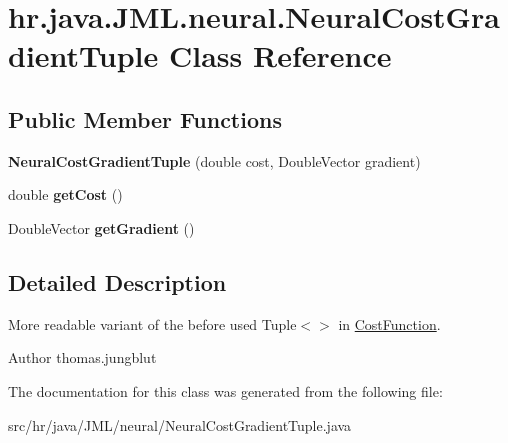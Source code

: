 \hypertarget{classhr_1_1java_1_1_j_m_l_1_1neural_1_1_neural_cost_gradient_tuple}{\section{hr.\+java.\+J\+M\+L.\+neural.\+Neural\+Cost\+Gradient\+Tuple Class Reference}
\label{classhr_1_1java_1_1_j_m_l_1_1neural_1_1_neural_cost_gradient_tuple}
}
\subsection*{Public Member Functions}
\begin{DoxyCompactItemize}
\item 
\hypertarget{classhr_1_1java_1_1_j_m_l_1_1neural_1_1_neural_cost_gradient_tuple_a46fe2e7f1fb0c65b3c9f5e56e49f31e3}{{\bfseries Neural\+Cost\+Gradient\+Tuple} (double cost, Double\+Vector gradient)}\label{classhr_1_1java_1_1_j_m_l_1_1neural_1_1_neural_cost_gradient_tuple_a46fe2e7f1fb0c65b3c9f5e56e49f31e3}

\item 
\hypertarget{classhr_1_1java_1_1_j_m_l_1_1neural_1_1_neural_cost_gradient_tuple_ac0b348d079d3d3bb121501a3198a5e2a}{double {\bfseries get\+Cost} ()}\label{classhr_1_1java_1_1_j_m_l_1_1neural_1_1_neural_cost_gradient_tuple_ac0b348d079d3d3bb121501a3198a5e2a}

\item 
\hypertarget{classhr_1_1java_1_1_j_m_l_1_1neural_1_1_neural_cost_gradient_tuple_afe8955a29eeae12780025db1c94ac4c9}{Double\+Vector {\bfseries get\+Gradient} ()}\label{classhr_1_1java_1_1_j_m_l_1_1neural_1_1_neural_cost_gradient_tuple_afe8955a29eeae12780025db1c94ac4c9}

\end{DoxyCompactItemize}


\subsection{Detailed Description}
More readable variant of the before used Tuple$<$$>$ in \hyperlink{}{Cost\+Function}.

\begin{DoxyAuthor}{Author}
thomas.\+jungblut 
\end{DoxyAuthor}


The documentation for this class was generated from the following file\+:\begin{DoxyCompactItemize}
\item 
src/hr/java/\+J\+M\+L/neural/Neural\+Cost\+Gradient\+Tuple.\+java\end{DoxyCompactItemize}
